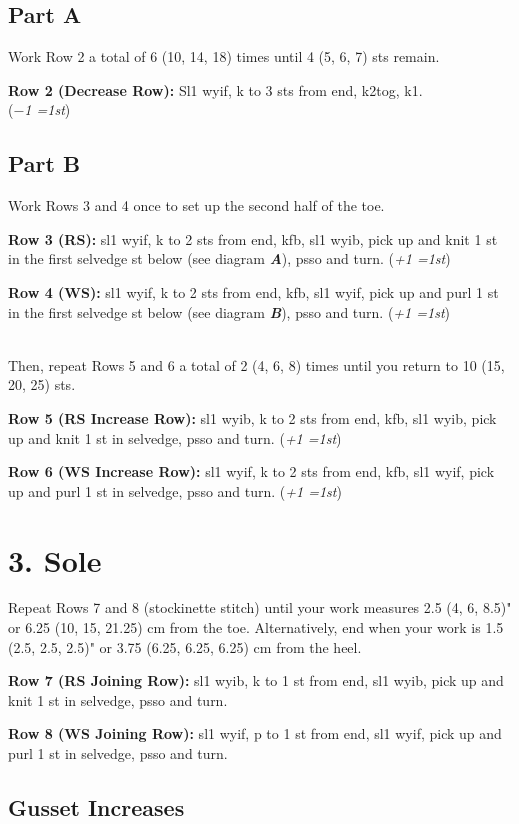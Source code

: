 \documentclass[12pt]{article}
\newcommand{\vocab}[1]{\emph{\textbf{#1}}} %
\newcommand{\rowDir}[1]{\textbf{#1:}} %
\newcommand{\increase}[1]{(\emph{+#1 
	\ifnum#1=1{st}\else{sts}\fi})}
\newcommand{\decrease}[1]{(\emph{$-$#1
	\ifnum#1=1{st}\else{sts}\fi})}
\begin{document}
\subsection*{Part A}
Work Row 2 a total of 6 (10, 14, 18) times 
until 4 (5, 6, 7) sts remain.

\rowDir{Row 2 (Decrease Row)} Sl1 wyif, k to 3 sts from end, k2tog, k1. \\\decrease{1}

\subsection*{Part B}

Work Rows 3 and 4 once to set up the second half of the toe.

\rowDir{Row 3 (RS)} sl1 wyif, k to 2 sts from end, kfb, sl1 wyib, pick up and knit 1 st in the first selvedge st below (see diagram \vocab{A}), psso and turn. \increase{1}

\rowDir{Row 4 (WS)} sl1 wyif, k to 2 sts from end, kfb, sl1 wyif, pick up and purl 1 st in the first selvedge st below (see diagram \vocab{B}), psso and turn. \increase{1}

~\\
Then, repeat Rows 5 and 6 a total of 2 (4, 6, 8) times 
until you return to 10 (15, 20, 25) sts.

\rowDir{Row 5 (RS Increase Row)} sl1 wyib, k to 2 sts from end, kfb, sl1 wyib, pick up and knit 1 st in selvedge, psso and turn. \increase{1}

\rowDir{Row 6 (WS Increase Row)} sl1 wyif, k to 2 sts from end, kfb, sl1 wyif, pick up and purl 1 st in selvedge, psso and turn. \increase{1}

\section*{3. Sole}

Repeat Rows 7 and 8 (stockinette stitch) until your work measures 2.5 (4, 6, 8.5)" or 6.25 (10, 15, 21.25) cm
from the toe. Alternatively, end when your work is 1.5 (2.5, 2.5, 2.5)" or 3.75 (6.25, 6.25, 6.25) cm from the heel.

\rowDir{Row 7 (RS Joining Row)} sl1 wyib, k to 1 st from end, sl1 wyib, pick up and knit 1 st in selvedge, psso and turn.

\rowDir{Row 8 (WS Joining Row)} sl1 wyif, p to 1 st from end, sl1 wyif, pick up and purl 1 st in selvedge, psso and turn.

\pagebreak
\subsection*{Gusset Increases} 
\end{document}
